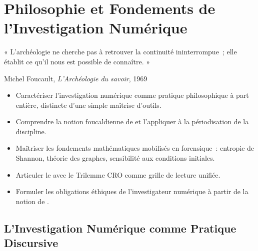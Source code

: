
\chapter{Philosophie et Fondements de l'Investigation Numérique}
\label{chap:phi-fond}

\epigraph{%
    « L'archéologie ne cherche pas à retrouver la continuité ininterrompue~;
    elle établit ce qu'il nous est possible de connaître. »%
}{Michel Foucault, \textit{L'Archéologie du savoir}, 1969}


\begin{boxobjectifs}
\begin{itemize}
    \item Caractériser l'investigation numérique comme pratique philosophique
          à part entière, distincte d'une simple maîtrise d'outils.
    \item Comprendre la notion foucaldienne de  et l'appliquer à la périodisation de la discipline.
    \item Maîtriser les fondements mathématiques mobilisés en forensique~:
          entropie de Shannon, théorie des graphes, sensibilité aux
          conditions initiales.
    \item Articuler le 
          avec le Trilemme CRO comme grille de lecture unifiée.
    \item Formuler les obligations éthiques de l'investigateur numérique
          à partir de la notion de .
\end{itemize}
\end{boxobjectifs}

\bigskip

\section{L'Investigation Numérique comme Pratique Discursive}

